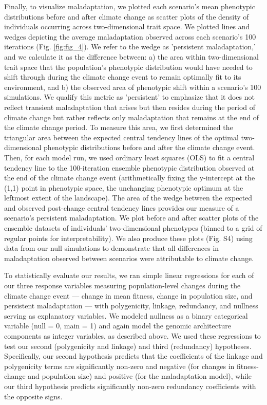 \documentclass[9pt,twocolumn,twoside,lineno]{new_article}
\begin{document}
Finally, to visualize maladaptation, we plotted each scenario's
mean phenotypic distributions before and after climate change as scatter plots of the density of individuals occurring across
two-dimensional trait space. We plotted lines and wedges depicting the average maladaptation
observed across each scenario's 100 iterations (Fig. \ref{fig:fig_4}).
We refer to the wedge as 'persistent maladaptation,'
and we calculate it as the difference between: a) the area 
within two-dimensional trait space that the population’s phenotypic distribution 
would have needed to shift through during the climate change event to remain 
optimally fit to its environment, and b) the observed area of phenotypic shift within
a scenario's 100 simulations.
We qualify this metric as 'persistent' to emphasize that it does
not reflect transient maladaptation that arises but then
resides during the period of climate change but rather reflects
only maladaptation that remains at the end of the climate change period.
To measure this area, we first determined the triangular area between 
the expected central tendency lines of the optimal two-dimensional phenotypic distributions
before and after the climate change event.
Then, for each model run, we used ordinary least squares (OLS)
to fit a central tendency line to the 100-iteration ensemble phenotypic distribution
observed at the end of the climate change event
(arithmetically fixing the y-intercept at the (1,1) point in phenotypic 
space, the unchanging phenotypic optimum at the leftmost extent of the landscape).
The area of the wedge between the expected and observed post-change central tendency
lines provides our measure of a scenario's persistent maladaptation.
We plot before and after scatter plots of the ensemble datasets
of individuals' two-dimensional phenotypes
(binned to a grid of regular points for interpretability).
We also produce these plots (Fig. S4) using data from our null simulations to demonstrate that all differences
in maladaptation observed between scenarios were attributable to climate change.

To statistically evaluate our results,
we ran simple linear regressions
for each of our three response variables measuring
population-level changes during the climate change event --- change in mean fitness, change in population size,
and persistent maladaptation --- with polygenicity,
linkage, redundancy, and nullness serving as explanatory variables.
We modeled nullness as a binary categorical variable (null = 0, main = 1)
and again model the genomic architecture components
as integer variables, as described above.
We used these regressions to test our second 
(polygenicity and linkage) and third (redundancy) hypotheses.
Specifically, our second hypothesis predicts that
the coefficients of the linkage and polygenicity terms are significantly
non-zero and negative (for changes in fitness-change
and population size) and positive (for the maladaptation
model),
while our third hypothesis predicts significantly non-zero
redundancy coefficients with the opposite signs.
\end{document}
